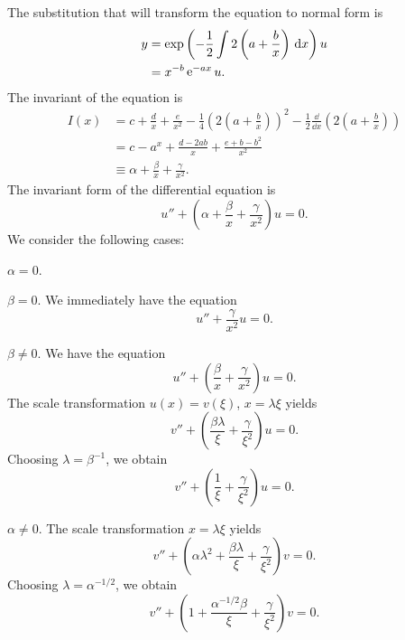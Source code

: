 {%
\begin{Solution}
  \label{solution canonical y2abxycdxex2y=0}
  The substitution that will transform the equation to normal form is
  \begin{align*}
    y &= \exp \left( -\frac{1}{2} \int 2 \left( a + \frac{b}{x} \right) 
      \,\mathrm{d} x \right) u \\
    &= x^{-b} \mathop{\mathrm{e}}\nolimits^{-ax} u.
  \end{align*}
  The invariant of the equation is
  \begin{align*}
    I(x) &= c + \frac{d}{x} + \frac{e}{x^2} - \frac{1}{4} \left( 
      2 \left( a + \frac{b}{x} \right) \right)^2 - \frac{1}{2} 
    \frac{\dd}{\dd x} \left( 2 \left(a + \frac{b}{x} \right) \right) \\
    &= c - a^x + \frac{d-2a b}{x} + \frac{e+b-b^2}{x^2} \\
    &\equiv \alpha + \frac{\beta}{x} + \frac{\gamma}{x^2}.
  \end{align*}
  The invariant form of the differential equation is
  \[
  u'' + \left( \alpha + \frac{\beta}{x} + \frac{\gamma}{x^2} \right)u = 0.
  \]
  We consider the following cases:
  \begin{description}
  \item{$\alpha = 0$.}
    \begin{description}
    \item{$\beta = 0$.}
      We immediately have the equation 
      \[
      u'' + \frac{\gamma}{x^2} u = 0.
      \]
    \item{$\beta \neq 0$.}
      We have the equation
      \[
      u'' + \left( \frac{\beta}{x} + \frac{\gamma}{x^2} \right) u = 0.
      \]
      The scale transformation $u(x) = v(\xi)$, $x = \lambda \xi$ yields
      \[
      v'' + \left( \frac{\beta \lambda}{\xi} + \frac{\gamma}{\xi^2} \right)u=0.
      \]
      Choosing $\lambda = \beta^{-1}$, we obtain
      \[
      v'' + \left( \frac{1}{\xi} + \frac{\gamma}{\xi^2} \right)u=0.
      \]
    \end{description}
  \item{$\alpha \neq 0$.}
    The scale transformation $x = \lambda \xi$ yields
    \[
    v'' + \left( \alpha \lambda^2 + \frac{\beta \lambda}{\xi} 
      + \frac{\gamma}{\xi^2} \right) v = 0.
    \]
    Choosing $\lambda = \alpha^{-1/2}$, we obtain
    \[
    v'' + \left( 1 + \frac{\alpha^{-1/2} \beta}{\xi} + \frac{\gamma}{\xi^2}
    \right) v = 0.
    \]
  \end{description}
\end{Solution}









}

